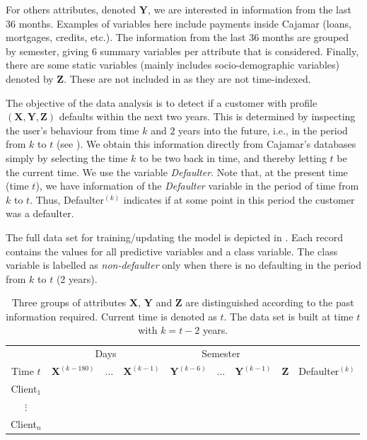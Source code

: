 \documentclass{article}
\theoremstyle{theorem}
\theoremstyle{definition}
\newcommand{\X}{\mathbf{X}}
\newcommand{\Y}{\mathbf{Y}}
\newcommand{\Z}{\mathbf{Z}}
\begin{document}
For others attributes, denoted  $\Y$, we are interested in information from the last $36$ months. Examples of variables here include payments inside Cajamar (loans, mortgages, credits, etc.). 
The information from the last 36 months are grouped by semester, giving $6$ summary variables per attribute that is considered. 
Finally, there are some static variables (mainly includes socio-demographic variables) denoted by $\Z$. These are not included in  as they are not time-indexed. 

The objective of the data analysis is to detect if a customer with profile $(\X,\Y,\Z)$ defaults within the next two years. This is determined by inspecting the user's behaviour from time $k$ and $2$ years into the future, i.e., in the period from $k$ to $t$ (see ). We obtain this information directly from Cajamar's databases simply by selecting the time $k$ to be two back in time, and thereby letting $t$ be the current time. We use the variable \textit{Defaulter}. Note that, at the present time (time $t$), we have information of the \textit{Defaulter} variable in the period of time from $k$ to $t$. Thus,  Defaulter$^{(k)}$ indicates if at some point in this period the customer was a defaulter.

The full data set for training/updating the model is depicted in . Each record contains the values for all predictive variables and a class variable. The class variable is labelled as \emph{non-defaulter} only when there is no defaulting in the period from $k$ to $t$ (2 years). 
\begin{table}[ht!]
\centering
\begin{tabular}{c|ccc|ccc|c|c}
	&\multicolumn{3}{c|}{Days} & \multicolumn{3}{c|}{Semester} & \\
     Time $t$              & $\X^{(k-180)}$ & $\ldots$ & $\X^{(k-1)} $ & $\Y^{(k-6)}$  & $\ldots$ & $\Y^{(k-1)} $ & $\Z$ & Defaulter$^{(k)}$\\  
\hline
Client$_1$  &                                                  &              &                     &                               &                     &        &  \\ 
$\vdots$      &                                                 &               &                     &                                &                     &       & \\ 
Client$_n$  &                                                &               &                     &                                &                     &     & \\ 
\end{tabular} 
\caption{Three groups of attributes $\X$, $\Y$ and $\Z$ are distinguished according to the past information required. Current time is denoted as $t$. The data set is built at time $t$ with $k=t - 2$ years. }
\label{tab:TrainingDataset} 
\end{table}
\end{document}
